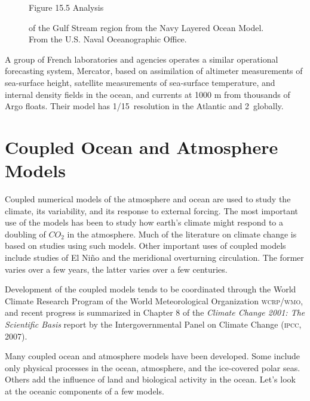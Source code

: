 \begin{figure}[h!]
\centering
\vspace{-1ex}
\footnotesize
Figure 15.5 Analysis \rule{0mm}{4ex}of the Gulf Stream
region from the Navy Layered Ocean Model.\\From the U.S. Naval Oceanographic Office.

\label{fig:nlom-gulfstream}
\vspace{-3ex}
\end{figure}

A group of French laboratories and agencies operates a similar operational forecasting system,
Mercator, based on assimilation of altimeter
measurements of sea-surface height, satellite measurements of sea-surface temperature, and
internal density fields in the ocean, and currents at 1000 m from thousands of Argo
floats. Their model has 1/15\degrees\ resolution in the Atlantic and
2\degrees\ globally. 

\section{Coupled Ocean and Atmosphere Models}
Coupled numerical models of the atmosphere and ocean are used to study the climate, its variability, and its response to external forcing. The most important use of the models has been to study how earth's climate might respond to a doubling of $CO_{2}$ in the atmosphere. Much of the literature on climate change is based on studies using such models. Other important uses of coupled models include studies of El Ni\~{n}o and the meridional overturning circulation. The former varies over a few years, the latter varies over a few centuries.

Development of the coupled models tends to be coordinated through the World Climate Research Program of the World Meteorological Organization \textsc{wcrp/wmo}, and recent progress is summarized in Chapter 8 of the \textit{Climate Change 2001: The Scientific Basis} report by the Intergovernmental Panel on Climate Change (\textsc{ipcc}, 2007).

Many coupled ocean and atmosphere models have been developed. Some include only physical processes in the ocean, atmosphere, and the ice-covered polar seas. Others add the influence of land and biological activity in the ocean. Let's look at the oceanic components of a few models.


